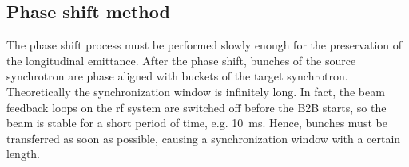 %
%
%
%

\subsection{Phase shift method}




The phase shift process must be performed slowly enough for the preservation of the longitudinal emittance. After the phase shift, bunches of the source synchrotron are phase aligned with buckets of the target synchrotron. Theoretically the synchronization window is infinitely long. In fact, the beam feedback loops on the rf system are switched off before the B2B starts, so the beam is stable for a short period of time, e.g. \SI{10}{ms}. Hence, bunches must be transferred as soon as possible, causing a synchronization window with a certain length.

